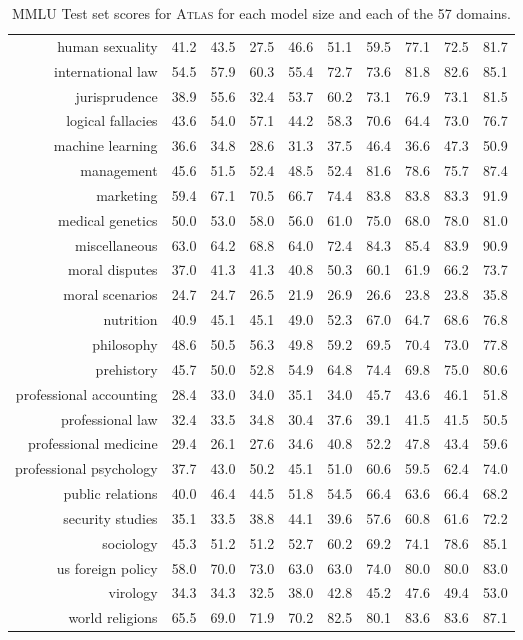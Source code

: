 \documentclass[10pt]{article} \usepackage[preprint]{tmlr}
\newcommand{\Atlas}{\textsc{Atlas}}
\begin{document}
\begin{table*}
{\begin{tabular}{r ccc ccc ccc}
human sexuality	&	41.2	&	43.5	&	27.5	&	46.6	&	51.1	&	59.5	&	77.1	&	72.5	&	81.7	\\
international law	&	54.5	&	57.9	&	60.3	&	55.4	&	72.7	&	73.6	&	81.8	&	82.6	&	85.1	\\
jurisprudence	&	38.9	&	55.6	&	32.4	&	53.7	&	60.2	&	73.1	&	76.9	&	73.1	&	81.5	\\
logical fallacies	&	43.6	&	54.0	&	57.1	&	44.2	&	58.3	&	70.6	&	64.4	&	73.0	&	76.7	\\
machine learning	&	36.6	&	34.8	&	28.6	&	31.3	&	37.5	&	46.4	&	36.6	&	47.3	&	50.9	\\
management	&	45.6	&	51.5	&	52.4	&	48.5	&	52.4	&	81.6	&	78.6	&	75.7	&	87.4	\\
marketing	&	59.4	&	67.1	&	70.5	&	66.7	&	74.4	&	83.8	&	83.8	&	83.3	&	91.9	\\
medical genetics	&	50.0	&	53.0	&	58.0	&	56.0	&	61.0	&	75.0	&	68.0	&	78.0	&	81.0	\\
miscellaneous	&	63.0	&	64.2	&	68.8	&	64.0	&	72.4	&	84.3	&	85.4	&	83.9	&	90.9	\\
moral disputes	&	37.0	&	41.3	&	41.3	&	40.8	&	50.3	&	60.1	&	61.9	&	66.2	&	73.7	\\
moral scenarios	&	24.7	&	24.7	&	26.5	&	21.9	&	26.9	&	26.6	&	23.8	&	23.8	&	35.8	\\
nutrition	&	40.9	&	45.1	&	45.1	&	49.0	&	52.3	&	67.0	&	64.7	&	68.6	&	76.8	\\
philosophy	&	48.6	&	50.5	&	56.3	&	49.8	&	59.2	&	69.5	&	70.4	&	73.0	&	77.8	\\
prehistory	&	45.7	&	50.0	&	52.8	&	54.9	&	64.8	&	74.4	&	69.8	&	75.0	&	80.6	\\
professional accounting	&	28.4	&	33.0	&	34.0	&	35.1	&	34.0	&	45.7	&	43.6	&	46.1	&	51.8	\\
professional law	&	32.4	&	33.5	&	34.8	&	30.4	&	37.6	&	39.1	&	41.5	&	41.5	&	50.5	\\
professional medicine	&	29.4	&	26.1	&	27.6	&	34.6	&	40.8	&	52.2	&	47.8	&	43.4	&	59.6	\\
professional psychology	&	37.7	&	43.0	&	50.2	&	45.1	&	51.0	&	60.6	&	59.5	&	62.4	&	74.0	\\
public relations	&	40.0	&	46.4	&	44.5	&	51.8	&	54.5	&	66.4	&	63.6	&	66.4	&	68.2	\\
security studies	&	35.1	&	33.5	&	38.8	&	44.1	&	39.6	&	57.6	&	60.8	&	61.6	&	72.2	\\
sociology	&	45.3	&	51.2	&	51.2	&	52.7	&	60.2	&	69.2	&	74.1	&	78.6	&	85.1	\\
us foreign policy	&	58.0	&	70.0	&	73.0	&	63.0	&	63.0	&	74.0	&	80.0	&	80.0	&	83.0	\\
virology	&	34.3	&	34.3	&	32.5	&	38.0	&	42.8	&	45.2	&	47.6	&	49.4	&	53.0	\\
world religions	&	65.5	&	69.0	&	71.9	&	70.2	&	82.5	&	80.1	&	83.6	&	83.6	&	87.1	\\
    \bottomrule
    \end{tabular}}
            \caption{MMLU Test set scores for \Atlas{} for each model size and each of the 57 domains.}
    \label{tab:full_mmlu}
\end{table*}
\end{document}
